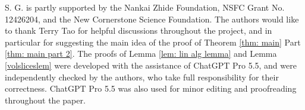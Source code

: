 \documentclass{article}
\numberwithin{equation}{section}
\theoremstyle{plain}
\begin{document}
S. G. is partly supported by the Nankai Zhide Foundation, NSFC Grant No. 12426204, and the New Cornerstone Science Foundation.
The authors would like to thank Terry Tao for helpful discussions throughout the project, and in particular for suggesting the main idea of the proof of Theorem \ref{thm: main} Part \ref{thm: main part 2}. The proofs of Lemma \ref{lem: lin alg lemma} and Lemma \ref{volsliceslem} were developed with the assistance of ChatGPT Pro 5.5, and were  independently checked by the authors, who take full
responsibility for their correctness. ChatGPT Pro 5.5 was also used for minor editing and proofreading throughout the paper. 








 
\end{document}
